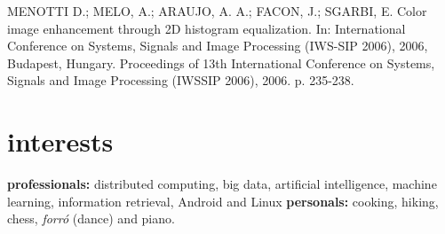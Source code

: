 \documentclass[]{friggeri-cv}
\begin{document}
MENOTTI D.; MELO, A.; ARAUJO, A. A.; FACON, J.; SGARBI, E. Color image enhancement through 2D histogram equalization. In: International Conference on Systems, Signals and Image Processing (IWS-SIP 2006), 2006, Budapest, Hungary. Proceedings of 13th International Conference on Systems, Signals and Image Processing (IWSSIP 2006), 2006. p. 235-238.

\section{interests}

\textbf{professionals:} distributed computing, big data, artificial intelligence, machine learning, information retrieval, Android and Linux \textbf{personals:} cooking, hiking,  chess, \textit{forró} (dance) and piano.
\end{document}
